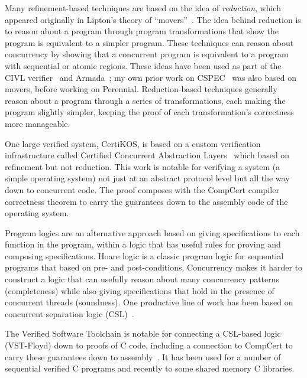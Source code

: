 Many refinement-based techniques are based on the idea of \emph{reduction},
which appeared originally in Lipton's theory of ``movers''~\cite{lipton:movers}.
The idea behind reduction is to reason about a program through program
transformations that show the program is equivalent to a simpler program. These
techniques can reason about concurrency by showing that a concurrent program is
equivalent to a program with sequential or atomic regions. These ideas have been
used as part of the CIVL verifier~\cite{hawblitzel:civl,kragl:civl-layers} and
Armada~\cite{lorch:armada}; my own prior work on CSPEC~\cite{chajed:cspec} was
also based on movers, before working on Perennial. Reduction-based techniques
generally reason about a program through a series of transformations, each
making the program slightly simpler, keeping the proof of each transformation's
correctness more manageable.

One large verified system, CertiKOS, is based on a custom verification
infrastructure called Certified Concurrent Abstraction
Layers~\cite{gu:certikos-ccal} which based on refinement but not reduction. This
work is notable for verifying a system (a simple operating system) not just at
an abstract protocol level but all the way down to concurrent code. The proof
composes with the CompCert compiler correctness theorem to carry the guarantees
down to the assembly code of the operating system.

Program logics are an alternative approach based on giving specifications to
each function in the program, within a logic that has useful rules for proving
and composing specifications. Hoare logic is a classic program
logic for sequential programs that based on pre- and post-conditions.
Concurrency makes it harder to construct a logic that can usefully reason about
many concurrency patterns (completeness) while also giving specifications that
hold in the presence of concurrent threads (soundness). One productive line of
work has been based on concurrent separation logic (CSL)~\cite{brookes:csl}.

The Verified Software Toolchain is notable for connecting a CSL-based logic
(VST-Floyd) down to proofs of C code, including a connection to CompCert to
carry these guarantees down to assembly~\cite{cao:vst-floyd}. It has been used
for a number of sequential verified C programs and recently to some shared
memory C libraries.

